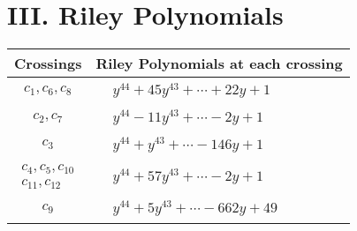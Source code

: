 \documentclass[1p]{elsarticle_modified}
\theoremstyle{definition}
\begin{document}
\centering \section*{ III. Riley Polynomials}
\begin{tabular}{m{50pt}|m{274pt}}
Crossings & \hspace{64pt}Riley Polynomials at each crossing \\
\hline $$\begin{aligned}c_{1},c_{6},c_{8}\end{aligned}$$&$\begin{aligned}
&y^{44}+45 y^{43}+\cdots+22 y+1
\end{aligned}$\\
\hline $$\begin{aligned}c_{2},c_{7}\end{aligned}$$&$\begin{aligned}
&y^{44}-11 y^{43}+\cdots-2 y+1
\end{aligned}$\\
\hline $$\begin{aligned}c_{3}\end{aligned}$$&$\begin{aligned}
&y^{44}+y^{43}+\cdots-146 y+1
\end{aligned}$\\
\hline $$\begin{aligned}c_{4},c_{5},c_{10}\\c_{11},c_{12}\end{aligned}$$&$\begin{aligned}
&y^{44}+57 y^{43}+\cdots-2 y+1
\end{aligned}$\\
\hline $$\begin{aligned}c_{9}\end{aligned}$$&$\begin{aligned}
&y^{44}+5 y^{43}+\cdots-662 y+49
\end{aligned}$\\
\hline
\end{tabular}
\vskip 2pc
\end{document}
